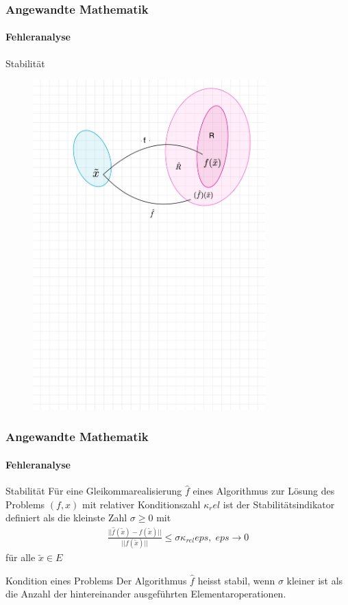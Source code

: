 \documentclass{beamer}
\begin{document}
\begin{frame}
    \frametitle{Angewandte Mathematik}
\framesubtitle{Fehleranalyse}
    \begin{block}{Stabilität}
\end{block}
\begin{figure}[H]
      \centering
    \includegraphics[width=0.8\textwidth]{images/stabilitaet}
      \caption{}
\end{figure}
 \end{frame}



\begin{frame}
    \frametitle{Angewandte Mathematik}
\framesubtitle{Fehleranalyse}
    \begin{block}{Stabilität}
Für eine Gleikommarealisierung $\hat{f}$ eines Algorithmus zur Lösung des Problems $(f,x)$ mit relativer Konditionszahl $\kappa_rel$ ist der Stabilitätsindikator definiert als die kleinste Zahl $\sigma \geq 0$ mit 
\begin{align*}
\frac{|| \hat{f}(\widetilde{x}) - f(\widetilde{x}) ||}{||f(\widetilde{x}) || } \leq \sigma  \kappa_{rel} eps , \; eps \to 0
\end{align*}
für alle $\widetilde{x} \in E$
\end{block}
    \begin{block}{Kondition eines Problems}
Der Algorithmus $\hat{f}$ heisst stabil, wenn $\sigma$ kleiner ist als die Anzahl der hintereinander ausgeführten Elementaroperationen. 
\end{block}
 \end{frame}
\end{document}
